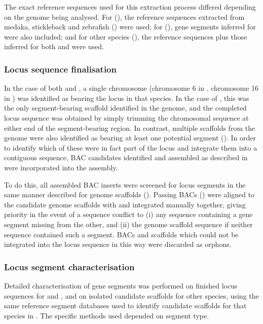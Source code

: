 The exact reference sequences used for this extraction process differed depending on the genome being analysed. For \nfu (), the reference sequences extracted from medaka, stickleback and zebrafish () were used; for \xma (), gene segments inferred for \Nfu were also included; and for other species (), the reference sequences plus those inferred for both \Nfu and \Xma were used.

\subsubsection{Locus sequence finalisation}
\label{sec:methods_comp_locus_final}

In the case of both \nfu and \xma, a single chromosome (chromosome 6 in \Nfu, chromosome 16 in \Xma) was identified as bearing the \igh{} locus in that species. In the case of \Xma, this was the only segment-bearing scaffold identified in the genome, and the completed locus sequence was obtained by simply trimming the chromosomal sequence at either end of the segment-bearing region. In contrast, multiple scaffolds from the \Nfu genome were also identified as bearing at least one potential \igh segment (). In order to identify which of these were in fact part of the locus and integrate them into a contiguous sequence, BAC candidates identified and assembled as described in  were incorporated into the assembly.

To do this, all assembled BAC inserts were screened for \igh{} locus segments in the same manner described for genome scaffolds (). Passing BACs () were aligned to the candidate genome scaffolds with  and integrated manually together, giving priority in the event of a sequence conflict to (i) any sequence containing a gene segment missing from the other, and (ii) the genome scaffold sequence if neither sequence contained such a segment. BACs and scaffolds which could not be integrated into the locus sequence in this way were discarded as orphons.

\subsubsection{Locus segment characterisation}
\label{sec:methods_comp_locus_segments}

Detailed characterisation of \igh{} gene segments was performed on finished \igh{} locus sequences for \xma and \nfu, and on isolated candidate scaffolds for other species, using the same reference segment databases used to identify candidate scaffolds for that species in . %
The specific methods used depended on segment type.

